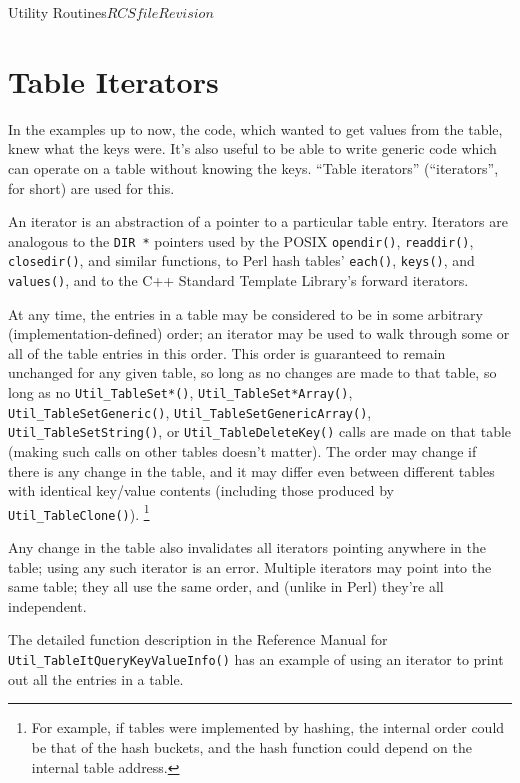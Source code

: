 \begin{cactuspart}{Utility Routines}{$RCSfile$}{$Revision$}

\section{Table Iterators}
\label{sect-UtilityRoutines/tables/table-iterators}

In the examples up to now, the code, which wanted to get values from
the table, knew what the keys were.  It's also useful to be able to
write generic code which can operate on a table without knowing the
keys.  ``Table iterators'' (``iterators'', for short) are used for this.

An iterator is an abstraction of a pointer to a particular table entry.
Iterators are analogous to the \verb|DIR *| pointers used by the POSIX
\verb|opendir()|, \verb|readdir()|, \verb|closedir()|, and similar
functions, to Perl hash tables' \verb|each()|, \verb|keys()|,
and \verb|values()|, and to the C++ Standard Template Library's
forward iterators.

At any time, the entries in a table may be considered to be in some
arbitrary (implementation-defined) order; an iterator may be used to
walk through some or all of the table entries in this order.  This
order is guaranteed to remain unchanged for any given table, so long
as no changes are made to that table, \ie{} so long as no
\verb|Util_TableSet*()|, \verb|Util_TableSet*Array()|,
\verb|Util_TableSetGeneric()|, \verb|Util_TableSetGenericArray()|,
\verb|Util_TableSetString()|, or \verb|Util_TableDeleteKey()| calls
are made on that table (making such calls on other tables doesn't
matter).  The order may change if there is any change in the table,
and it may differ even between different tables with identical key/value
contents (including those produced by \verb|Util_TableClone()|).%
\footnote{%
	 For example, if tables were implemented by hashing,
	 the internal order could be that of the hash buckets,
	 and the hash function could depend on the internal
	 table address.
	 }%
{}

Any change in the table also invalidates all iterators pointing
anywhere in the table; using any such iterator is an error.
Multiple iterators may point into the same table; they all use the
same order, and (unlike in Perl) they're all independent.

The detailed function description
in the Reference Manual
for \verb|Util_TableItQueryKeyValueInfo()| has an example of
using an iterator to print out all the entries in a table.


\end{cactuspart}
